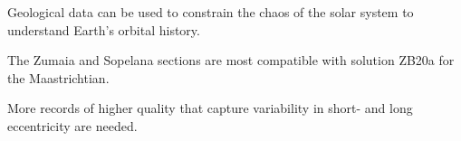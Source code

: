 \documentclass[draft]{agujournal2019}
\begin{document}

\begin{keypoints}
\item Geological data can be used to constrain the chaos of the solar system to understand Earth's orbital history.
\item The Zumaia and Sopelana sections are most compatible with solution ZB20a for the Maastrichtian.
\item More records of higher quality that capture variability in short- and long eccentricity are needed.
\end{keypoints}

%
%

%
%

\end{document}
